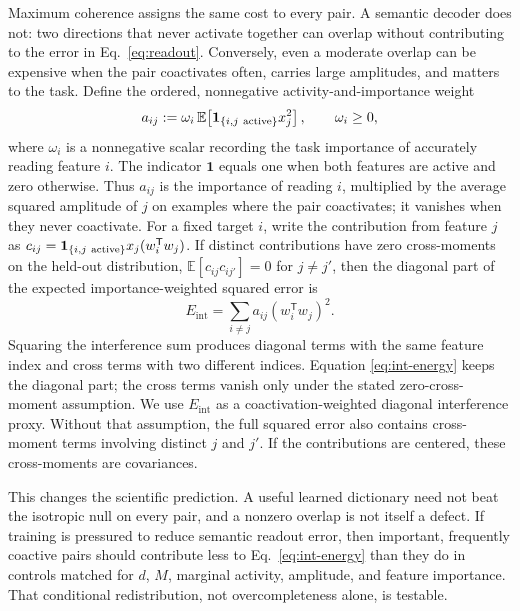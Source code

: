 \documentclass[
  aps,
  reprint,
  superscriptaddress,
  floatfix,
  nofootinbib,
  longbibliography
]{revtex4-2}
\newcommand{\E}{\mathbb{E}}
\newcommand{\Msem}{M}
\newcommand{\Eint}{E_{\mathrm{int}}}
\newcommand{\T}{^{\mathsf{T}}}
\begin{document}
Maximum coherence assigns the same cost to every pair.  A semantic decoder
does not: two directions that never activate together can overlap without
contributing to the error in Eq.~\eqref{eq:readout}.  Conversely, even a
moderate overlap can be expensive when the pair coactivates often, carries
large amplitudes, and matters to the task.  Define the ordered, nonnegative
activity-and-importance weight
\begin{equation}
\label{eq:coactivation}
a_{ij}
:=
\omega_i\,\E\!\left[
\mathbf 1_{\{i,j\ {\rm active}\}}x_j^2
\right],
\qquad \omega_i\geq0,
\end{equation}
where $\omega_i$ is a nonnegative scalar recording the task importance of accurately reading feature
$i$.  The indicator $\mathbf 1$ equals one when both features are active and
zero otherwise.  Thus $a_{ij}$ is the importance of reading $i$, multiplied by
the average squared amplitude of $j$ on examples where the pair coactivates;
it vanishes when they never coactivate.  For a fixed target $i$, write the
contribution from feature $j$ as
$c_{ij}=\mathbf 1_{\{i,j\ {\rm active}\}}x_j(w_i\T w_j)$.
If distinct contributions have zero cross-moments on the held-out distribution,
$\E[c_{ij}c_{ij'}]=0$ for $j\ne j'$, then the diagonal part of the expected
importance-weighted squared error is
\begin{equation}
\label{eq:int-energy}
\Eint
=
\sum_{i\ne j}
a_{ij}(w_i\T w_j)^2.
\end{equation}
Squaring the interference sum produces diagonal terms with the same feature
index and cross terms with two different indices.  Equation
\eqref{eq:int-energy} keeps the diagonal part; the cross terms vanish only
under the stated zero-cross-moment assumption.
We use $\Eint$ as a coactivation-weighted diagonal interference proxy.  Without
that assumption, the full squared error also contains cross-moment terms
involving distinct $j$ and $j'$.  If the contributions are centered, these
cross-moments are covariances.

This changes the scientific prediction.  A useful learned dictionary need
not beat the isotropic null on every pair, and a nonzero overlap is not itself
a defect.  If training is pressured to reduce semantic readout error, then
important, frequently coactive pairs should contribute less to
Eq.~\eqref{eq:int-energy} than they do in controls matched for $d$, $\Msem$,
marginal activity, amplitude, and feature importance.  That conditional
redistribution, not overcompleteness alone, is testable.
\end{document}
